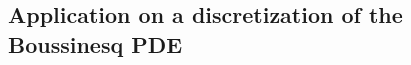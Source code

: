 \documentclass[11pt]{article}
\begin{document}



\subsection{Application on a discretization of the Boussinesq PDE}
\label{sec:boussinestPDErealdata}
\end{document}
